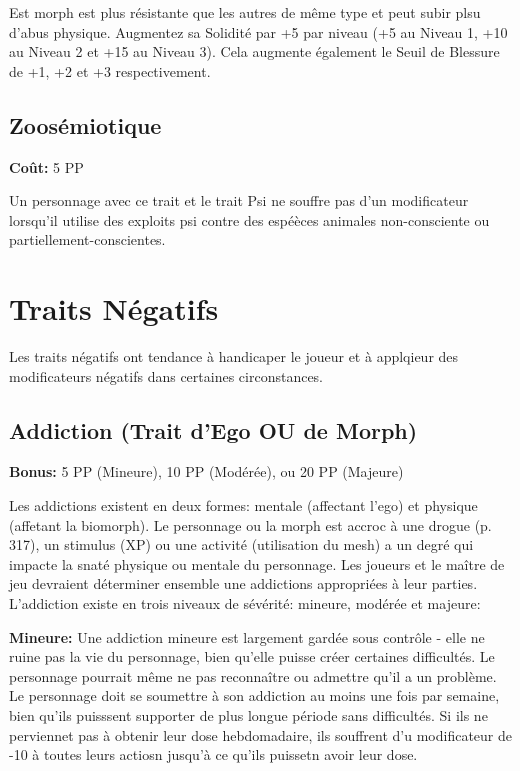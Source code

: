 Est morph est plus résistante que les autres de même type et peut subir plsu d'abus physique. Augmentez sa Solidité par +5 par niveau (+5 au Niveau 1, +10 au Niveau 2 et +15 au Niveau 3). Cela augmente également le Seuil de Blessure de +1, +2 et +3 respectivement. 

\subsection{Zoosémiotique} \label{sec:traits-zoosemiotics} 

\textbf{Coût:} 5 PP 

Un personnage avec ce trait et le trait Psi ne souffre pas d'un modificateur lorsqu'il utilise des exploits psi contre des espéèces animales non-consciente ou partiellement-conscientes. 

\section{Traits Négatifs} \label{sec:negative-traits} 

Les traits négatifs ont tendance à handicaper le joueur et à applqieur des modificateurs négatifs dans certaines circonstances. 

\subsection{Addiction (Trait d'Ego OU de Morph)} \label{sec:traits-addiction} 

\textbf{Bonus:} 5 PP (Mineure), 10 PP (Modérée), ou 20 PP (Majeure) 

\textbf{} Les addictions existent en deux formes: mentale (affectant l'ego) et physique (affetant la biomorph). Le personnage ou la morph est accroc à une drogue (p. 317), un stimulus (XP) ou une activité (utilisation du mesh) a un degré qui impacte la snaté physique ou mentale du personnage. Les joueurs et le maître de jeu devraient déterminer ensemble une addictions appropriées à leur parties. L'addiction existe en trois niveaux de sévérité: mineure, modérée et majeure: 

\textbf{Mineure:} Une addiction mineure est largement gardée sous contrôle - elle ne ruine pas la vie du personnage, bien qu'elle puisse créer certaines difficultés. Le personnage pourrait même ne pas reconnaître ou admettre qu'il a un problème. Le personnage doit se soumettre à son addiction au moins une fois par semaine, bien qu'ils puisssent supporter de plus longue période sans difficultés. Si ils ne perviennet pas à obtenir leur dose hebdomadaire, ils souffrent d'u modificateur de -10 à toutes leurs actiosn jusqu'à ce qu'ils puissetn avoir leur dose. 

